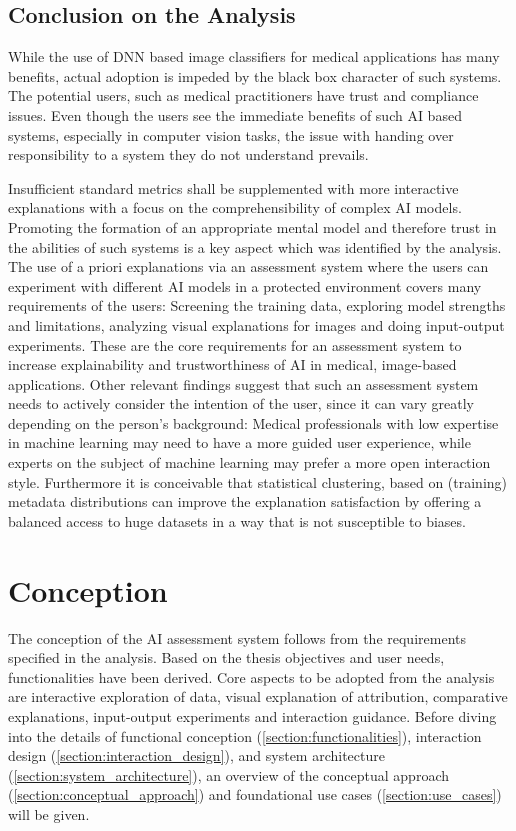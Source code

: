 \documentclass[11pt,a4paper,english]{scrreprt}
\begin{document}
\section{Conclusion on the Analysis}
While the use of DNN based image classifiers for medical applications has many benefits, actual adoption is impeded by the black box character of such systems. The potential users, such as medical practitioners have trust and compliance issues. Even though the users see the immediate benefits of such AI based systems, especially in computer vision tasks, the issue with handing over responsibility to a system they do not understand prevails.

Insufficient standard metrics shall be supplemented with more interactive explanations with a focus on the comprehensibility of complex AI models. Promoting the formation of an appropriate mental model and therefore trust in the abilities of such systems is a key aspect which was identified by the analysis. The use of a priori explanations via an assessment system where the users can experiment with different AI models in a protected environment covers many requirements of the users: Screening the training data, exploring model strengths and limitations, analyzing visual explanations for images and doing input-output experiments. These are the core requirements for an assessment system to increase explainability and trustworthiness of AI in medical, image-based applications. Other relevant findings suggest that such an assessment system needs to actively consider the intention of the user, since it can vary greatly depending on the person's background: Medical professionals with low expertise in machine learning may need to have a more guided user experience, while experts on the subject of machine learning may prefer a more open interaction style. Furthermore it is conceivable that statistical clustering, based on (training) metadata distributions can improve the explanation satisfaction by offering a balanced access to huge datasets in a way that is not susceptible to biases.

\newpage
\chapter{Conception}\label{chapter:conception}
The conception of the AI assessment system follows from the requirements specified in the analysis. Based on the thesis objectives and user needs, functionalities have been derived. Core aspects to be adopted from the analysis are interactive exploration of data, visual explanation of attribution, comparative explanations, input-output experiments and interaction guidance. Before diving into the details of functional conception (\autoref{section:functionalities}), interaction design (\autoref{section:interaction_design}), and system architecture (\autoref{section:system_architecture}), an overview of the conceptual approach (\autoref{section:conceptual_approach}) and foundational use cases (\autoref{section:use_cases}) will be given.
\end{document}

